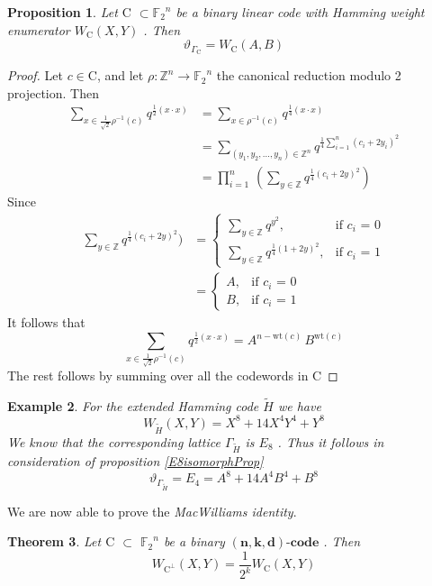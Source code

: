 \documentclass{article}
\newtheorem{theorem}{Theorem}[section]
\newtheorem{example}[theorem]{Example}
\newtheorem{prop}[theorem]{Proposition}
\numberwithin{equation}{theorem}
\numberwithin{figure}{theorem}
\newcommand{\Ftwo}{\ensuremath{\mathbb{F}_2}}
\newcommand{\simpleCodes}{\ensuremath{\mathrm{C}}}
\newcommand{\buildVertical}[1]{\ensuremath{#1^{\bot}}}
\newcommand{\buildLattice}[1]{\ensuremath{\Gamma_{#1}}}
\newcommand{\weightEnumerator}[3]{\ensuremath{W_{#1}(#2,#3)}}
\newcommand{\thetaFunction}[1]{\ensuremath{\vartheta_{#1}}}
\newcommand{\linearCode}[3]{\ensuremath{\bm{(#1,#2,#3)\mbox{-}code}}}
\newcommand{\wt}[1]{\ensuremath{\text{wt}(#1)}}
\newcommand{\Integer}{\ensuremath{\mathbb{Z}}}
\begin{document}
\begin{prop}\label{ABHammingProp}
Let {\simpleCodes} $\subset \Ftwo^n$ be a binary linear code with Hamming weight enumerator {\weightEnumerator{\simpleCodes}{X}{Y}} . Then
\[
	\thetaFunction{\buildLattice{\simpleCodes}} = \weightEnumerator{\simpleCodes}{A}{B}
\]
\end{prop}
\begin{proof}
Let $c \in \simpleCodes$, and let $\rho : \Integer^n \rightarrow \Ftwo^n$ the canonical reduction modulo 2 projection. Then
\begin{align*}
	\sum_{x \in \frac{1}{\sqrt{2}}\rho^{-1}(c)} q^{\frac{1}{2}(x\cdot x)} &= \sum_{x \in \rho^{-1}(c)} q^{\frac{1}{4}(x\cdot x)}\\
	&= \sum_{(y_1,y_2,\ldots,y_n) \in \Integer^n}q^{\frac{1}{4}\sum_{i = 1}^{n}(c_i + 2y_i)^2}\\
	&= \prod_{i = 1}^{n}\,(\sum_{y\in \Integer}q^{\frac{1}{4}(c_i + 2y)^2})
\end{align*}
Since
\begin{align*}
\sum_{y\in \Integer}q^{\frac{1}{4}(c_i + 2y)^2}) &= 
	\begin{cases}
	\sum_{y\in \Integer}q^{y^2}, &\text{if $c_i$ = 0}\\
	\sum_{y\in \Integer}q^{\frac{1}{4}(1 + 2y)^2}, &\text{if $c_i$ = 1} 
	\end{cases}\\
	&= 
	\begin{cases}
	A, &\text{if $c_i$ = 0} \\
	B, &\text{if $c_i$ = 1}
	\end{cases}
\end{align*}
It follows that
\[
\sum_{x \in \frac{1}{\sqrt{2}}\rho^{-1}(c)} q^{\frac{1}{2}(x\cdot x)} = A^{n - \wt{c}}\,B^{\wt{c}}
\] 
The rest follows by summing over all the codewords in $\simpleCodes$
\end{proof}
\begin{example}\label{e8Example}
For the extended Hamming code $\widetilde{H}$ we have
\[
\weightEnumerator{\widetilde{H}}{X}{Y} = X^8 + 14X^4Y^4 + Y^8
\]
We know that the corresponding lattice $\buildLattice{\widetilde{H}}$ is $E_8$ .
Thus it follows in consideration of proposition \ref{E8isomorphProp}
\[
	\thetaFunction{\buildLattice{\widetilde{H}}} = E_4 = A^8 + 14A^4B^4 + B^8
\]
\end{example}
We are now able to prove the \emph{MacWilliams identity}.
\begin{theorem}
Let {\simpleCodes} $\subset$ $\Ftwo^n$ be a binary \linearCode{n}{k}{d} . Then
\[
	\weightEnumerator{\buildVertical{\simpleCodes}}{X}{Y} = \frac{1}{2^k} \weightEnumerator{\simpleCodes}{X}{Y}
\]
\end{theorem}
\end{document}
